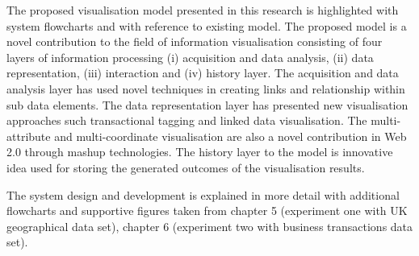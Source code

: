 The proposed visualisation model presented in this research is highlighted with system flowcharts and with reference to existing model. The proposed model is a novel contribution to the field of information visualisation consisting of four layers of information processing (i) acquisition and data analysis, (ii) data representation, (iii) interaction and (iv) history layer. The acquisition and data analysis layer has used novel techniques in creating links and relationship within sub data elements. The data representation layer has presented new visualisation approaches such transactional tagging and linked data visualisation. The multi-attribute and multi-coordinate visualisation are also a novel contribution in Web 2.0 through mashup technologies. The history layer to the model is innovative idea used for storing the generated outcomes of the visualisation results. 

The system design and development is explained in more detail with additional flowcharts and supportive figures taken from chapter 5 (experiment one with UK geographical data set), chapter 6 (experiment two with business transactions data set).